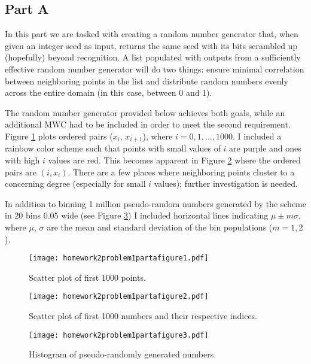 \subsection{Part A}

In this part we are tasked with creating a random number generator that, when given an integer seed as input, returns the same seed with its bits scrambled up (hopefully) beyond recognition. A list populated with outputs from a sufficiently effective random number generator will do two things: ensure minimal correlation between neighboring points in the list and distribute random numbers evenly across the entire domain (in this case, between 0 and 1).

The random number generator provided below achieves both goals, while an additional MWC had to be included in order to meet the second requirement. Figure \ref{fig:21a1} plots ordered pairs ($x_{i}$, $x_{i+1}$), where $i = 0, 1, \dots, 1000$. I included a rainbow color scheme such that points with small values of $i$ are purple and ones with high $i$ values are red. This becomes apparent in Figure \ref{fig:21a2} where the ordered pairs are $(i, x_{i})$. There are a few places where neighboring points cluster to a concerning degree (especially for small $i$ values); further investigation is needed.

In addition to binning 1 million pseudo-random numbers generated by the scheme in 20 bins 0.05 wide (see Figure \ref{fig:21a3}) I included horizontal lines indicating $\mu \pm m\sigma$, where $\mu$, $\sigma$ are the mean and standard deviation of the bin populations ($m = 1, 2$).





\clearpage

\begin{figure}[h]
    \centering
    \texttt{[image: homework2problem1partafigure1.pdf]}
    \caption{Scatter plot of first 1000 points.}
    \label{fig:21a1}
\end{figure}

\begin{figure}[h]
    \centering
    \texttt{[image: homework2problem1partafigure2.pdf]}
    \caption{Scatter plot of first 1000 numbers and their respective indices.}
    \label{fig:21a2}
\end{figure}

\begin{figure}[h]
    \centering
    \texttt{[image: homework2problem1partafigure3.pdf]}
    \caption{Histogram of pseudo-randomly generated numbers.}
    \label{fig:21a3}
\end{figure}

\clearpage
